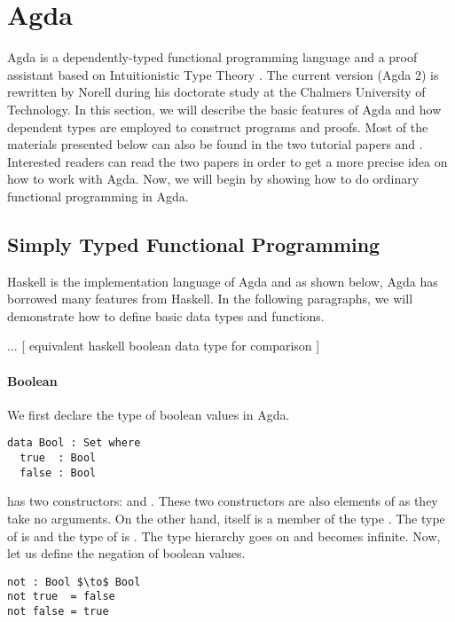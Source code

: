 \section{Agda}
\par Agda is a dependently-typed functional programming language and a
proof assistant based on Intuitionistic Type Theory
\cite{martin1984}. The current version (Agda 2) is rewritten by Norell
\cite{norell2007} during his doctorate study at the Chalmers University of
Technology. In this section, we will describe the basic features of
Agda and how dependent types are employed to construct programs and
proofs. Most of the materials presented below can also be
found in the two tutorial papers \cite{bove2009} and
\cite{norell2008}. Interested readers can read the two papers in order to get
a more precise idea on how to work with Agda. Now, we will begin by
showing how to do ordinary functional programming in Agda. 


\subsection{Simply Typed Functional Programming}
\par Haskell is the implementation language
of Agda and as shown below, Agda has borrowed many features from
Haskell. In the following paragraphs, we will demonstrate how to
define basic data types and functions. 

\par ... [ equivalent haskell boolean data type for comparison ]

\paragraph{Boolean} We first declare the type of boolean values in Agda.  
\begin{lstlisting}[mathescape=true,xleftmargin=.3\textwidth]
data Bool : Set where
  true  : Bool
  false : Bool
\end{lstlisting}

\par {} has two
constructors:  and . These two constructors
are also elements of  as they take no arguments. On
the other hand,  itself is a member of the type
. The type of  is  and the type of  is
. The type hierarchy goes on and becomes infinite. Now, let
us define the negation of boolean values. 

\begin{lstlisting}[mathescape=true,xleftmargin=.3\textwidth]
not : Bool $\to$ Bool
not true  = false
not false = true
\end{lstlisting}

